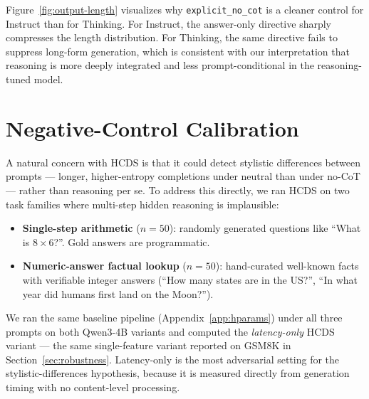 \documentclass{article}
\theoremstyle{plain}
\theoremstyle{definition}
\theoremstyle{remark}
\begin{document}
Figure~\ref{fig:output-length} visualizes why \texttt{explicit\_no\_cot}
is a cleaner control for Instruct than for Thinking. For Instruct, the
answer-only directive sharply compresses the length distribution. For
Thinking, the same directive fails to suppress long-form generation, which is
consistent with our interpretation that reasoning is more deeply integrated
and less prompt-conditional in the reasoning-tuned model.

\section{Negative-Control Calibration}
\label{app:negative-control}

A natural concern with HCDS is that it could detect stylistic
differences between prompts --- longer, higher-entropy completions
under neutral than under no-CoT --- rather than reasoning per se.
To address this directly, we ran HCDS on two task families where
multi-step hidden reasoning is implausible:

\begin{itemize}
\item \textbf{Single-step arithmetic} ($n=50$): randomly generated
  questions like ``What is $8 \times 6$?''. Gold answers are
  programmatic.
\item \textbf{Numeric-answer factual lookup} ($n=50$): hand-curated
  well-known facts with verifiable integer answers (``How many
  states are in the US?'', ``In what year did humans first land on
  the Moon?'').
\end{itemize}

We ran the same baseline pipeline (Appendix~\ref{app:hparams}) under
all three prompts on both Qwen3-4B variants and computed the
\emph{latency-only} HCDS variant --- the same single-feature variant
reported on GSM8K in Section~\ref{sec:robustness}. Latency-only is the
most adversarial setting for the stylistic-differences hypothesis,
because it is measured directly from generation timing with no
content-level processing.
\end{document}
